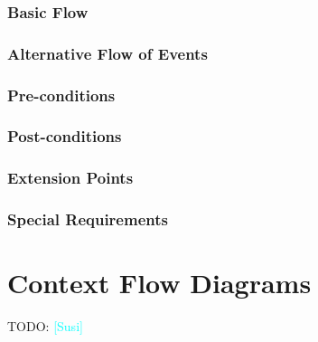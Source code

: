 \documentclass{article}
\newcommand{\susi}{\textcolor{cyan}{[Susi]}}
\begin{document}
\subsubsection{Basic Flow}

\subsubsection{Alternative Flow of Events}

\subsubsection{Pre-conditions}

\subsubsection{Post-conditions}

\subsubsection{Extension Points}

\subsubsection{Special Requirements}

\section{Context Flow Diagrams}
TODO: \susi
\end{document}
